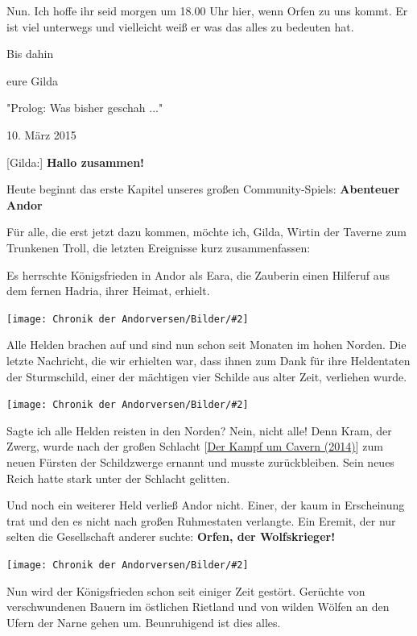 \documentclass[10pt, a4paper, oneside]{book}
\newcommand{\reflegende}[1]{\hyperref[Legende: #1]{#1}}
\newcommand{\bildmitts}[2][height=0.32\textwidth,width=0.48\textwidth,keepaspectratio]{%
    \begin{center}
        \texttt{[image: Chronik der Andorversen/Bilder/\#2]}
    \end{center}
}
\begin{document}
\begin{multicols}{2}
Nun. Ich hoffe ihr seid morgen um 18.00 Uhr hier, wenn Orfen zu uns kommt. Er ist viel unterwegs und vielleicht weiß er was das alles zu bedeuten hat.

Bis dahin

eure Gilda






\begin{center}
    "Prolog: Was bisher geschah ..."

    10. März 2015
\end{center}

[Gilda:] \textbf{Hallo zusammen!}

Heute beginnt das erste Kapitel unseres großen Community-Spiels: \textbf{Abenteuer Andor}

Für alle, die erst jetzt dazu kommen, möchte ich, Gilda, Wirtin der Taverne zum Trunkenen Troll, die letzten Ereignisse kurz zusammenfassen:


Es herrschte Königsfrieden in Andor als Eara, die Zauberin einen Hilferuf aus dem fernen Hadria, ihrer Heimat, erhielt.

\bildmitts{AA2015 Was bisher geschah 1.jpeg}

Alle Helden brachen auf und sind nun schon seit Monaten im hohen Norden. Die letzte Nachricht, die wir erhielten war, dass ihnen zum Dank für ihre Heldentaten der Sturmschild, einer der mächtigen vier Schilde aus alter Zeit, verliehen wurde.

\bildmitts{AA2015 Was bisher geschah 2.jpeg}

Sagte ich alle Helden reisten in den Norden? Nein, nicht alle! Denn Kram, der Zwerg, wurde nach der großen Schlacht [\reflegende{Der Kampf um Cavern (2014)}] zum neuen Fürsten der Schildzwerge ernannt und musste zurückbleiben. Sein neues Reich hatte stark unter der Schlacht gelitten.

Und noch ein weiterer Held verließ Andor nicht. Einer, der kaum in Erscheinung trat und den es nicht nach großen Ruhmestaten verlangte. Ein Eremit, der nur selten die Gesellschaft anderer suchte: \textbf{Orfen, der Wolfskrieger!}

\bildmitts{AA2015 Was bisher geschah 3.jpeg}

Nun wird der Königsfrieden schon seit einiger Zeit gestört. Gerüchte von verschwundenen Bauern im östlichen Rietland und von wilden Wölfen an den Ufern der Narne gehen um. Beunruhigend ist dies alles.


\end{multicols}
\end{document}
